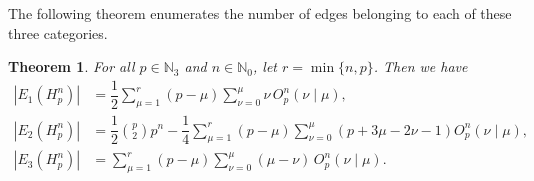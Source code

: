 \documentclass[letterpaper,12pt]{article}
\newtheorem{theorem}{Theorem}
\begin{document}
 


 

The following theorem enumerates the number of edges belonging to each of these three categories.

\begin{theorem}
For all $p \in \mathbb{N}_3$ and $n \in \mathbb{N}_0$,  let $r = \min\{n, p\}$. Then we have
\begin{align}
    |E_1(H_p^n)| &= \dfrac{1}{2} \sum_{\mu = 1}^{r} (p - \mu) \sum_{\nu = 0}^{\mu} \nu \, O_p^n(\nu \mid \mu),\label{eq:E1} \\
    |E_2(H_p^n)| &= \dfrac{1}{2} \binom{p}{2} p^n - \dfrac{1}{4} \sum_{\mu = 1}^{r} (p - \mu) \sum_{\nu = 0}^{\mu} \left(p + 3\mu - 2\nu - 1 \right) O_p^n(\nu \mid \mu),\label{eq:E2} \\
    |E_3(H_p^n)| &= \sum_{\mu = 1}^{r} (p - \mu) \sum_{\nu = 0}^{\mu} (\mu - \nu) \, O_p^n(\nu \mid \mu).\label{eq:E3}
\end{align}
\end{theorem}
\end{document}
